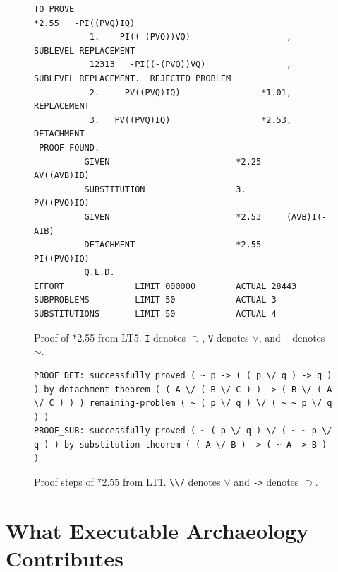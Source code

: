 \documentclass[journal]{IEEEtran}
\begin{document}
\begin{figure}
\caption{Proof of *2.55 from LT5. \lstinline|I| denotes $\supset$, \lstinline|V| denotes 
$\vee$, and \lstinline|-| denotes $\sim$.}
\label{proof5255}
\begin{lstlisting}
TO PROVE
*2.55   -PI((PVQ)IQ)
           1.   -PI((-(PVQ))VQ)                   , SUBLEVEL REPLACEMENT
           12313   -PI((-(PVQ))VQ)                , SUBLEVEL REPLACEMENT.  REJECTED PROBLEM
           2.   --PV((PVQ)IQ)                *1.01, REPLACEMENT
           3.   PV((PVQ)IQ)                  *2.53, DETACHMENT
 PROOF FOUND.
          GIVEN                         *2.25     AV((AVB)IB)
          SUBSTITUTION                  3.        PV((PVQ)IQ)
          GIVEN                         *2.53     (AVB)I(-AIB)
          DETACHMENT                    *2.55     -PI((PVQ)IQ)
          Q.E.D.
EFFORT              LIMIT 000000        ACTUAL 28443
SUBPROBLEMS         LIMIT 50            ACTUAL 3
SUBSTITUTIONS       LIMIT 50            ACTUAL 4
\end{lstlisting}
\end{figure}

\begin{figure}
\caption{Proof steps of *2.55 from LT1. \lstinline|\\/| denotes $\vee$ and \lstinline|->| denotes $\supset$.}
\label{proof1255}
\begin{lstlisting}
PROOF_DET: successfully proved ( ~ p -> ( ( p \/ q ) -> q ) ) by detachment theorem ( ( A \/ ( B \/ C ) ) -> ( B \/ ( A \/ C ) ) ) remaining-problem ( ~ ( p \/ q ) \/ ( ~ ~ p \/ q ) )
PROOF_SUB: successfully proved ( ~ ( p \/ q ) \/ ( ~ ~ p \/ q ) ) by substitution theorem ( ( A \/ B ) -> ( ~ A -> B ) )
\end{lstlisting}
\end{figure}



%
%

\section{What Executable Archaeology Contributes}
\label{sec:contribution}

\end{document}
